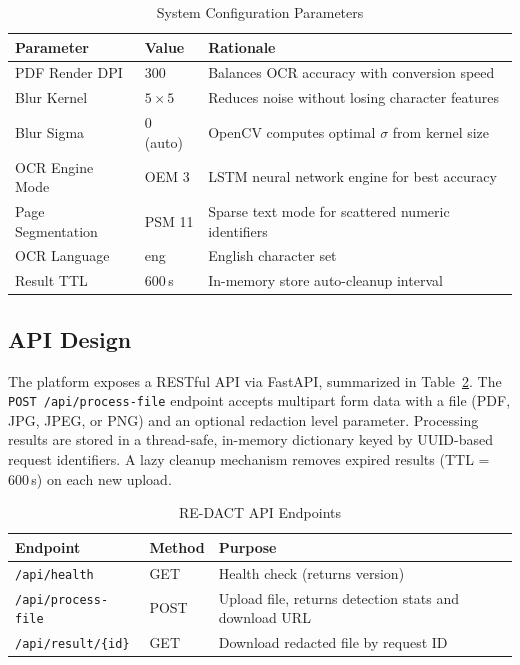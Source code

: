 \documentclass[conference]{IEEEtran}
\begin{document}
\begin{table}[htbp]
\caption{System Configuration Parameters}
\label{tab:config_params}
\centering
\begin{tabular}{@{}llp{3.2cm}@{}}
\toprule
\textbf{Parameter} & \textbf{Value} & \textbf{Rationale} \\
\midrule
PDF Render DPI   & 300         & Balances OCR accuracy with conversion speed \\
Blur Kernel      & $5\!\times\!5$ & Reduces noise without losing character features \\
Blur Sigma       & 0 (auto)    & OpenCV computes optimal $\sigma$ from kernel size \\
OCR Engine Mode  & OEM 3       & LSTM neural network engine for best accuracy \\
Page Segmentation & PSM 11     & Sparse text mode for scattered numeric identifiers \\
OCR Language     & eng         & English character set \\
Result TTL       & 600\,s      & In-memory store auto-cleanup interval \\
\bottomrule
\end{tabular}
\end{table}

\subsection{API Design}
The platform exposes a RESTful API via FastAPI, summarized in Table~\ref{tab:api_endpoints}. The \texttt{POST /api/process-file} endpoint accepts multipart form data with a file (PDF, JPG, JPEG, or PNG) and an optional redaction level parameter. Processing results are stored in a thread-safe, in-memory dictionary keyed by UUID-based request identifiers. A lazy cleanup mechanism removes expired results (TTL = 600\,s) on each new upload.

\begin{table}[htbp]
\caption{RE-DACT API Endpoints}
\label{tab:api_endpoints}
\centering
\begin{tabular}{@{}llp{3.5cm}@{}}
\toprule
\textbf{Endpoint} & \textbf{Method} & \textbf{Purpose} \\
\midrule
\texttt{/api/health}         & GET  & Health check (returns version) \\
\texttt{/api/process-file}   & POST & Upload file, returns detection stats and download URL \\
\texttt{/api/result/\{id\}}  & GET  & Download redacted file by request ID \\
\bottomrule
\end{tabular}
\end{table}
\end{document}
